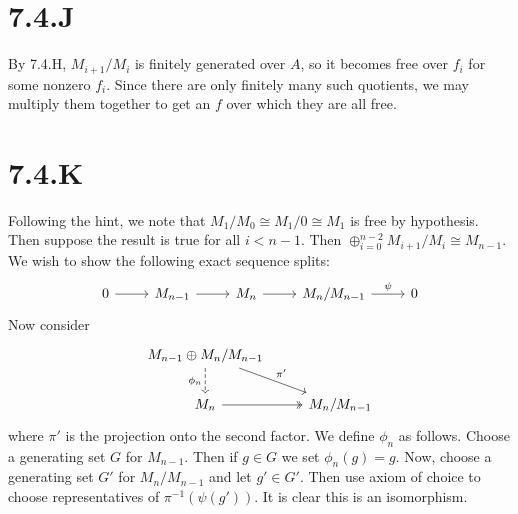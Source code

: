 \documentclass{article}
\begin{document}
\section{7.4.J}
By 7.4.H, $M_{i+1}/M_i$ is finitely generated over
$A$, so it becomes free over $f_i$ for
some nonzero $f_i$. Since there are only finitely many such
quotients, we may multiply them together to get an $f$ over
which they are all free.

\section{7.4.K}
Following the hint, we note that $M_1/M_0 \cong M_1/0 \cong M_1$ is free by hypothesis.
Then suppose the result is true for all $i < n-1$. Then
$\oplus_{i=0}^{n-2} M_{i+1}/M_i \cong
    M_{n-1}$. We wish to show the following exact sequence splits:
\[
    \begin{tikzcd}
        0 \ar[r] & M_{n-1} \ar[r] & M_n \ar[r] & M_n/M_{n-1} \ar[r, "\psi"] & 0
    \end{tikzcd}
\]  Now consider \[
    \begin{tikzcd}
        {M_{n-1}\oplus M_n/M_{n-1}} \\
        {M_n} & {M_n/M_{n-1}}
        \arrow["\pi'",from=1-1, to=2-2]
        \arrow[two heads, from=2-1, to=2-2]
        \arrow["\phi_n"', dashed, from=1-1, to=2-1]
    \end{tikzcd}
\] where
$\pi'$ is the projection onto the second factor. We define
$\phi_n$ as follows. Choose a generating set
$G$ for $M_{n-1}$. Then if
$g \in G$ we set $\phi_n(g)=g$. Now, choose a
generating set $G'$ for $M_n/M_{n-1}$ and let
$g' \in G'$. Then use axiom of choice to choose representatives of
$\pi^{-1}(\psi(g'))$. It is clear this is an isomorphism.
\end{document}
